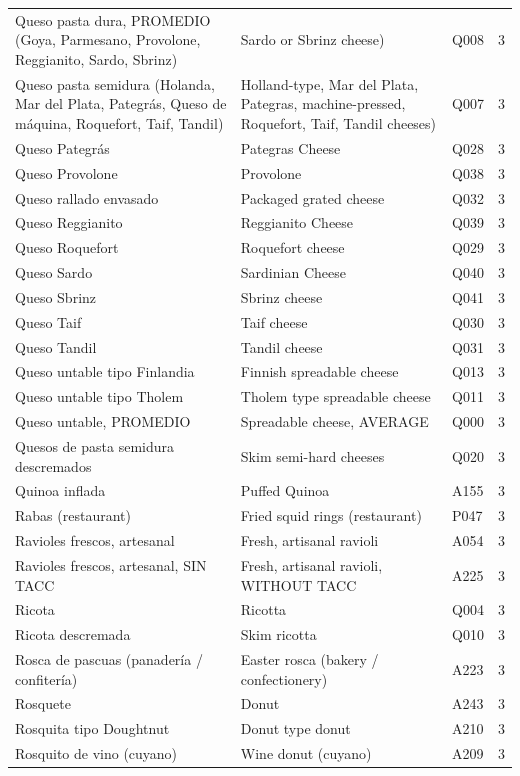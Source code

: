 {\begin{longtable}{p{4.3cm}p{5.5cm}p{1.5cm}p{0.7cm}}
Queso pasta dura, PROMEDIO (Goya, Parmesano, Provolone, Reggianito, Sardo, Sbrinz) & Sardo or Sbrinz cheese) & Q008 & 3\\
Queso pasta semidura (Holanda, Mar del Plata, Pategrás, Queso de máquina, Roquefort, Taif, Tandil) & Holland-type, Mar del Plata, Pategras, machine-pressed, Roquefort, Taif, Tandil cheeses) & Q007 & 3\\
Queso Pategrás & Pategras Cheese & Q028 & 3\\
Queso Provolone & Provolone & Q038 & 3\\
Queso rallado envasado & Packaged grated cheese & Q032 & 3\\
Queso Reggianito & Reggianito Cheese & Q039 & 3\\
Queso Roquefort & Roquefort cheese & Q029 & 3\\
Queso Sardo & Sardinian Cheese & Q040 & 3\\
Queso Sbrinz & Sbrinz cheese & Q041 & 3\\
Queso Taif & Taif cheese & Q030 & 3\\
Queso Tandil & Tandil cheese & Q031 & 3\\
Queso untable tipo Finlandia & Finnish spreadable cheese & Q013 & 3\\
Queso untable tipo Tholem & Tholem type spreadable cheese & Q011 & 3\\
Queso untable, PROMEDIO & Spreadable cheese, AVERAGE & Q000 & 3\\
Quesos de pasta semidura descremados & Skim semi-hard cheeses & Q020 & 3\\
Quinoa inflada & Puffed Quinoa & A155 & 3\\
Rabas (restaurant) & Fried squid rings (restaurant) & P047 & 3\\
Ravioles frescos, artesanal & Fresh, artisanal ravioli & A054 & 3\\
Ravioles frescos, artesanal, SIN TACC & Fresh, artisanal ravioli, WITHOUT TACC & A225 & 3\\
Ricota & Ricotta & Q004 & 3\\
Ricota descremada & Skim ricotta & Q010 & 3\\
Rosca de pascuas (panadería / confitería) & Easter rosca (bakery / confectionery) & A223 & 3\\
Rosquete & Donut & A243 & 3\\
Rosquita tipo Doughtnut & Donut type donut & A210 & 3\\
Rosquito de vino (cuyano) & Wine donut (cuyano) & A209 & 3\\

\end{longtable}}
